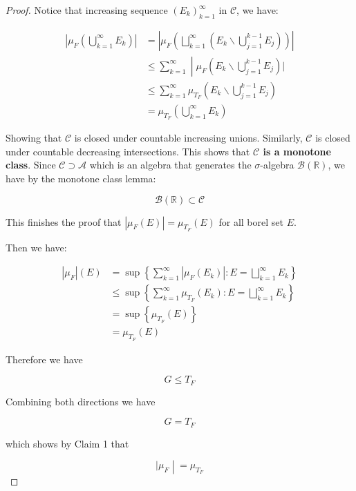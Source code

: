 \documentclass{qlnotes-export}
\begin{document}
\begin{proof}
Notice that increasing sequence \(\left( E_{k} \right)_{k = 1}^{\infty}\) in \(\mathcal{C}\), we have:

\[\begin{matrix}
\left| {\mu_{F}\left( {\bigcup\limits_{k = 1}^{\infty}E_{k}} \right)} \right| & {= \left| {\mu_{F}\left( {\bigsqcup\limits_{k = 1}^{\infty}(E_{k}\backslash\bigcup\limits_{j = 1}^{k - 1}E_{j})} \right)} \right|} \\
 & \left. \leq \sum\limits_{k = 1}^{\infty} \middle| \mu_{F}(E_{k}\backslash\bigcup\limits_{j = 1}^{k - 1}E_{j})| \right. \\
 & {\leq \sum\limits_{k = 1}^{\infty}\mu_{T_{F}}(E_{k}\backslash\bigcup\limits_{j = 1}^{k - 1}E_{j})} \\
 & {= \mu_{T_{F}}\left( {\bigcup\limits_{k = 1}^{\infty}E_{k}} \right)}
\end{matrix}\]

Showing that \(\mathcal{C}\) is closed under countable increasing unions. Similarly, \(\mathcal{C}\) is closed under countable decreasing intersections. This shows that \textbf{\(\mathcal{C}\) is a monotone class}. Since \(\mathcal{C} \supset \mathcal{A}\) which is an algebra that generates the \(\sigma\)-algebra \(\mathcal{B}({\mathbb{R}})\), we have by the monotone class lemma:

\[\mathcal{B}({\mathbb{R}}) \subset \mathcal{C}\]

This finishes the proof that \(\left| {\mu_{F}(E)} \right| = \mu_{T_{F}}(E)\) for all borel set \(E\).

Then we have:

\[\begin{matrix}
{\left| \mu_{F} \right|(E)} & {= \sup\left\{ {\sum\limits_{k = 1}^{\infty}\left| {\mu_{F}\left( E_{k} \right)} \right|:E = \bigsqcup\limits_{k = 1}^{\infty}E_{k}} \right\}} \\
 & {\leq \sup\left\{ {\sum\limits_{k = 1}^{\infty}\mu_{T_{F}}\left( E_{k} \right):E = \bigsqcup\limits_{k = 1}^{\infty}E_{k}} \right\}} \\
 & {= \sup\left\{ {\mu_{T_{F}}(E)} \right\}} \\
 & {= \mu_{T_{F}}(E)}
\end{matrix}\]

Therefore we have

\[G \leq T_{F}\]

Combining both directions we have

\[G = T_{F}\]

which shows by Claim 1 that

\[\left. |\mu_{F} \middle| = \mu_{T_{F}} \right.\]

\end{proof}
\end{document}
